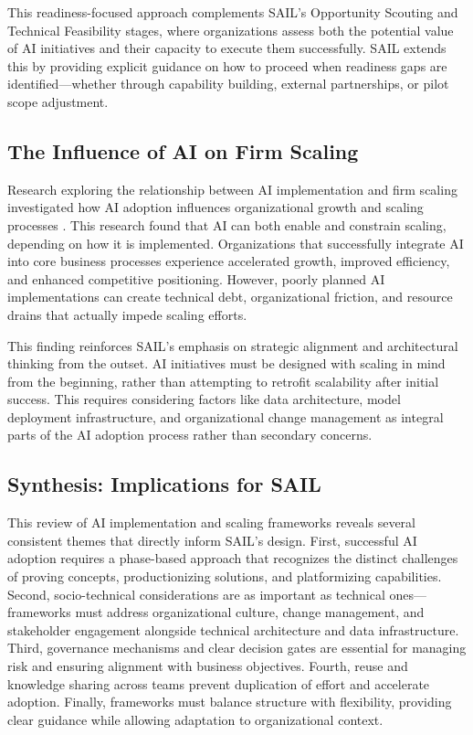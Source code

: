 \documentclass[]{imc-inf}
\begin{document}
This readiness-focused approach complements SAIL's Opportunity Scouting and Technical Feasibility stages, where organizations assess both the potential value of AI initiatives and their capacity to execute them successfully. SAIL extends this by providing explicit guidance on how to proceed when readiness gaps are identified---whether through capability building, external partnerships, or pilot scope adjustment.

\subsection{The Influence of AI on Firm Scaling}

Research exploring the relationship between AI implementation and firm scaling investigated how AI adoption influences organizational growth and scaling processes \citep{Mecca2024}. This research found that AI can both enable and constrain scaling, depending on how it is implemented. Organizations that successfully integrate AI into core business processes experience accelerated growth, improved efficiency, and enhanced competitive positioning. However, poorly planned AI implementations can create technical debt, organizational friction, and resource drains that actually impede scaling efforts.

This finding reinforces SAIL's emphasis on strategic alignment and architectural thinking from the outset. AI initiatives must be designed with scaling in mind from the beginning, rather than attempting to retrofit scalability after initial success. This requires considering factors like data architecture, model deployment infrastructure, and organizational change management as integral parts of the AI adoption process rather than secondary concerns.

\subsection{Synthesis: Implications for SAIL}

This review of AI implementation and scaling frameworks reveals several consistent themes that directly inform SAIL's design. First, successful AI adoption requires a phase-based approach that recognizes the distinct challenges of proving concepts, productionizing solutions, and platformizing capabilities. Second, socio-technical considerations are as important as technical ones---frameworks must address organizational culture, change management, and stakeholder engagement alongside technical architecture and data infrastructure. Third, governance mechanisms and clear decision gates are essential for managing risk and ensuring alignment with business objectives. Fourth, reuse and knowledge sharing across teams prevent duplication of effort and accelerate adoption. Finally, frameworks must balance structure with flexibility, providing clear guidance while allowing adaptation to organizational context.
\end{document}
